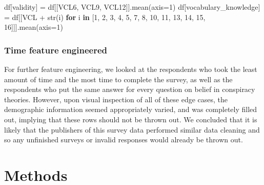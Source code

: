 \documentclass[11pt]{article}
\newenvironment{Shaded}{}{}
\newcommand{\KeywordTok}[1]{\textcolor[rgb]{0.00,0.44,0.13}{\textbf{{#1}}}}
\newcommand{\DecValTok}[1]{\textcolor[rgb]{0.25,0.63,0.44}{{#1}}}
\newcommand{\StringTok}[1]{\textcolor[rgb]{0.25,0.44,0.63}{{#1}}}
\newcommand{\NormalTok}[1]{{#1}}
\newcommand{\ControlFlowTok}[1]{\textcolor[rgb]{0.00,0.44,0.13}{\textbf{{#1}}}}
\newcommand{\OperatorTok}[1]{\textcolor[rgb]{0.40,0.40,0.40}{{#1}}}
\newcommand{\BuiltInTok}[1]{{#1}}
\begin{document}
\begin{Shaded}
\begin{Highlighting}[]
\NormalTok{df[}\StringTok{\textquotesingle{}validity\textquotesingle{}}\NormalTok{] }\OperatorTok{=}\NormalTok{ df[[}\StringTok{\textquotesingle{}VCL6\textquotesingle{}}\NormalTok{, }\StringTok{\textquotesingle{}VCL9\textquotesingle{}}\NormalTok{, }\StringTok{\textquotesingle{}VCL12\textquotesingle{}}\NormalTok{]].mean(axis}\OperatorTok{=}\DecValTok{1}\NormalTok{)}
\NormalTok{df[}\StringTok{\textquotesingle{}vocabulary\_knowledge\textquotesingle{}}\NormalTok{] }\OperatorTok{=}\NormalTok{ df[[}\StringTok{\textquotesingle{}VCL\textquotesingle{}} \OperatorTok{+} \BuiltInTok{str}\NormalTok{(i) }\ControlFlowTok{for}\NormalTok{ i }\KeywordTok{in}\NormalTok{ [}\DecValTok{1}\NormalTok{, }\DecValTok{2}\NormalTok{, }\DecValTok{3}\NormalTok{, }\DecValTok{4}\NormalTok{, }\DecValTok{5}\NormalTok{, }\DecValTok{7}\NormalTok{, }\DecValTok{8}\NormalTok{, }\DecValTok{10}\NormalTok{, }\DecValTok{11}\NormalTok{, }\DecValTok{13}\NormalTok{, }\DecValTok{14}\NormalTok{, }\DecValTok{15}\NormalTok{, }\DecValTok{16}\NormalTok{]]].mean(axis}\OperatorTok{=}\DecValTok{1}\NormalTok{)}
\end{Highlighting}
\end{Shaded}

\hypertarget{time-feature-engineered}{%
\subsubsection*{Time feature engineered}\label{time-feature-engineered}}

For further feature engineering, we looked at the respondents who took
the least amount of time and the most time to complete the survey, as
well as the respondents who put the same answer for every question on
belief in conspiracy theories. However, upon visual inspection of all of
these edge cases, the demographic information seemed appropriately
varied, and was completely filled out, implying that these rows should
not be thrown out. We concluded that it is likely that the publishers of
this survey data performed similar data cleaning and so any unfinished
surveys or invalid responses would already be thrown out.

\hypertarget{methods}{%
\section*{Methods}\label{methods}}
\end{document}
